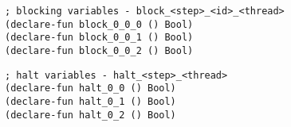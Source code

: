 \begin{algorithm}[H]
\end{algorithm}

\begin{lstlisting}[language=SMTLib]
; blocking variables - block_<step>_<id>_<thread>
(declare-fun block_0_0_0 () Bool)
(declare-fun block_0_0_1 () Bool)
(declare-fun block_0_0_2 () Bool)
\end{lstlisting}


\begin{algorithm}[H]
\end{algorithm}

\begin{algorithm}[H]
\end{algorithm}

\begin{lstlisting}[language=SMTLib]
; halt variables - halt_<step>_<thread>
(declare-fun halt_0_0 () Bool)
(declare-fun halt_0_1 () Bool)
(declare-fun halt_0_2 () Bool)
\end{lstlisting}


\begin{algorithm}[H]
\end{algorithm}

\begin{algorithm}[H]
\end{algorithm}

